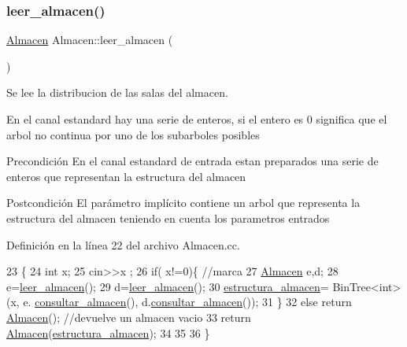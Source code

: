 \subsubsection{\texorpdfstring{leer\+\_\+almacen()}{leer\_almacen()}}
{\footnotesize\ttfamily \hyperlink{class_almacen}{Almacen} Almacen\+::leer\+\_\+almacen (\begin{DoxyParamCaption}{ }\end{DoxyParamCaption})}



Se lee la distribucion de las salas del almacen. 

En el canal estandard hay una serie de enteros, si el entero es 0 significa que el arbol no continua por uno de los subarboles posibles \begin{DoxyPrecond}{Precondición}
En el canal estandard de entrada estan preparados una serie de enteros que representan la estructura del almacen 
\end{DoxyPrecond}
\begin{DoxyPostcond}{Postcondición}
El parámetro implícito contiene un arbol que representa la estructura del almacen teniendo en cuenta los parametros entrados 
\end{DoxyPostcond}


Definición en la línea 22 del archivo Almacen.\+cc.


\begin{DoxyCode}
23 \{   
24     \textcolor{keywordtype}{int} x;
25     cin>>x ;
26     \textcolor{keywordflow}{if}( x!=0)\{  \textcolor{comment}{//marca}
27         \hyperlink{class_almacen}{Almacen} e,d;
28         e=\hyperlink{class_almacen_a36e2c6293837248738e5783e8e69795d}{leer\_almacen}();
29         d=\hyperlink{class_almacen_a36e2c6293837248738e5783e8e69795d}{leer\_almacen}();
30         \hyperlink{class_almacen_a0744bed3ca8c796990c939bbf7fc03b9}{estructura\_almacen}= BinTree<int> (x, e.
      \hyperlink{class_almacen_af16a0a319f91554aad713c14ee95715b}{consultar\_almacen}(), d.\hyperlink{class_almacen_af16a0a319f91554aad713c14ee95715b}{consultar\_almacen}());
31     \}
32     \textcolor{keywordflow}{else} \textcolor{keywordflow}{return} \hyperlink{class_almacen_a68a6084d5775d391c52d4825072a0612}{Almacen}(); \textcolor{comment}{//devuelve un almacen vacio}
33     \textcolor{keywordflow}{return} \hyperlink{class_almacen_a68a6084d5775d391c52d4825072a0612}{Almacen}(\hyperlink{class_almacen_a0744bed3ca8c796990c939bbf7fc03b9}{estructura\_almacen});
34    
35 
36 \}
\end{DoxyCode}
\mbox{\label{class_almacen_a0757bdd016511f5b2b1019060c0b2a9c}} 

